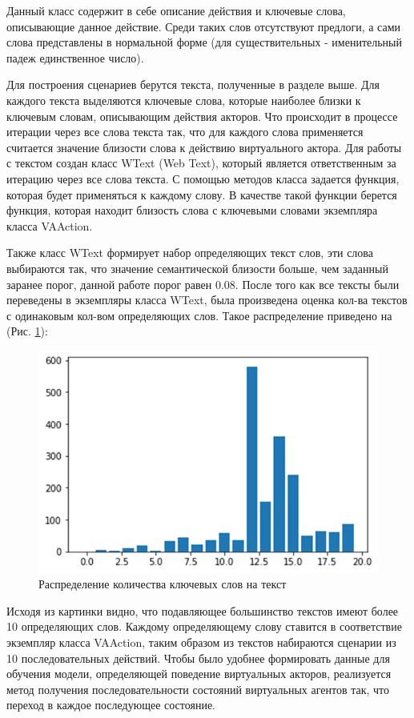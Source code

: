 Данный класс содержит в себе описание действия и ключевые слова, описывающие данное действие. 
Среди таких слов отсутствуют предлоги, а сами слова представлены в нормальной форме 
(для существительных - именительный падеж единственное число).

Для построения сценариев берутся текста, полученные в разделе выше. Для каждого текста выделяются ключевые слова, 
которые наиболее близки к ключевым словам, описывающим действия акторов. Что происходит в процессе итерации через 
все слова текста так, что для каждого слова применяется считается значение близости слова к действию виртуального 
актора. Для работы с текстом создан класс WText (Web Text), который является ответственным за итерацию через все 
слова текста. С помощью методов класса задается функция, которая будет применяться к каждому слову. В качестве 
такой функции берется функция, которая находит близость слова с ключевыми словами экземпляра класса VAAction.

Также класс WText формирует набор определяющих текст слов, эти слова выбираются так, что значение 
семантической близости больше, чем заданный заранее порог, данной работе порог равен 0.08. После 
того как все тексты были переведены в экземпляры класса WText, была произведена оценка кол-ва 
текстов с одинаковым кол-вом определяющих слов. Такое распределение приведено на (Рис. \ref{pic:ris16}):

\begin{figure}[H]
\includegraphics[width=0.75\columnwidth]{./img/ris16.png}
\centering
\caption{Распределение количества ключевых слов на текст}
\label{pic:ris16}
\end{figure}

Исходя из картинки видно, что подавляющее большинство текстов имеют более 10 определяющих слов. 
Каждому определяющему слову ставится в соответствие экземпляр класса VAAction, таким образом из 
текстов набираются сценарии из 10 последовательных действий.
Чтобы было удобнее формировать данные для обучения модели, определяющей поведение виртуальных акторов, 
реализуется метод получения последовательности состояний виртуальных агентов так, что переход в каждое последующее состояние.

